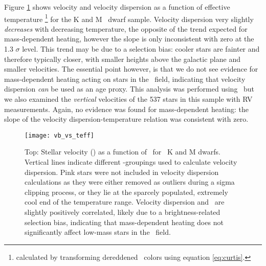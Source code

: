 Figure \ref{fig:vb_vs_teff} shows velocity and velocity dispersion as a
function of effective temperature \footnote{calculated by transforming
dereddened \gaia\ colors using equation \ref{eq:curtis}.} for the K and M
\kepler\ dwarf sample.
Velocity dispersion very slightly {\it decreases} with decreasing temperature,
the opposite of the trend expected for mass-dependent heating, however the
slope is only inconsistent with zero at the 1.3 $\sigma$ level.
This trend may be due to a selection bias: cooler stars are fainter and
therefore typically closer, with smaller heights above the galactic plane and
smaller velocities.
The essential point however, is that we do not see evidence for mass-dependent
heating acting on stars in the \kepler\ field, indicating that velocity
dispersion {\it can} be used as an age proxy.
This analysis was performed using \vb\ but we also examined the {\it vertical}
velocities of the 537 stars in this sample with RV measurements.
Again, no evidence was found for mass-dependent heating: the slope of the
velocity dispersion-temperature relation was consistent with zero.
\begin{figure}
  \caption{
      Top: Stellar velocity (\vb) as a function of \teff\ for
      \kepler\ K and M dwarfs.
Vertical lines indicate different \teff-groupings used to calculate velocity
    dispersion.
Pink stars were not included in velocity dispersion calculations as they were
    either removed as outliers during a sigma clipping process, or they lie at
    the sparcely populated, extremely cool end of the temperature range.
    Velocity dispersion and \teff\ are slightly positively correlated, likely
    due to a brightness-related selection bias, indicating that mass-dependent
    heating does not significantly affect low-mass stars in the \kepler\
    field.
}
  \centering
    \texttt{[image: vb\_vs\_teff]}
\label{fig:vb_vs_teff}
\end{figure}

